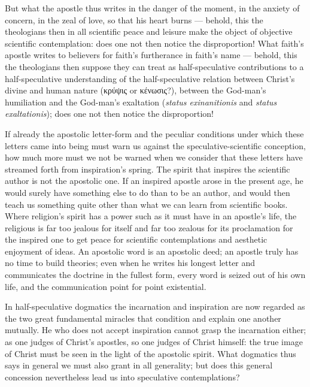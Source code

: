 \documentclass[12pt,a4paper]{book}
\begin{document}
But what the apostle thus writes in the danger of the moment, in the anxiety of concern, in the
zeal of love, so that his heart burns --- behold, this the theologians then in all scientific
peace and leisure make the object of objective scientific contemplation: does one
not then notice the disproportion! What faith's apostle writes to believers for faith's
furtherance in faith's name --- behold, this the theologians then suppose they can treat as
half-speculative contributions to a half-speculative understanding of the half-speculative
relation between Christ's divine and human nature (κρύψις or κένωσις?), between the God-man's
humiliation and the God-man's
exaltation (\textit{status exinanitionis} and \textit{status exaltationis}); does one not then
notice the disproportion!

If already the apostolic letter-form and the peculiar conditions under which these letters came
into being must warn us against the speculative-scientific conception, how much more must we not
be warned when we consider that these letters have streamed forth from inspiration's spring. The
spirit that inspires the scientific author is not the apostolic one. If an inspired apostle
arose in the present age, he would surely have something else to do than to be an author, and
would then teach us something quite other than what we can learn from scientific books. Where
religion's spirit has a power such as it must have in an apostle's life, the religious is far
too jealous for itself and far too zealous for its proclamation for the inspired one to get
peace for scientific contemplations and aesthetic enjoyment of ideas. An apostolic word is an
apostolic deed; an apostle truly has no time to build theories; even when he writes his longest
letter and communicates the doctrine in the fullest form, every word is seized out of his own
life, and the communication point for point existential.

In half-speculative dogmatics the incarnation and inspiration are now regarded as the two great
fundamental miracles that condition and explain one another mutually. He who does not accept
inspiration cannot grasp the incarnation either; as one judges of Christ's apostles, so one
judges of Christ himself: the true image of Christ must be seen in the light of the apostolic
spirit. What dogmatics thus says in general we must also grant
in all generality; but does this general concession nevertheless lead us into speculative
contemplations?
\end{document}
